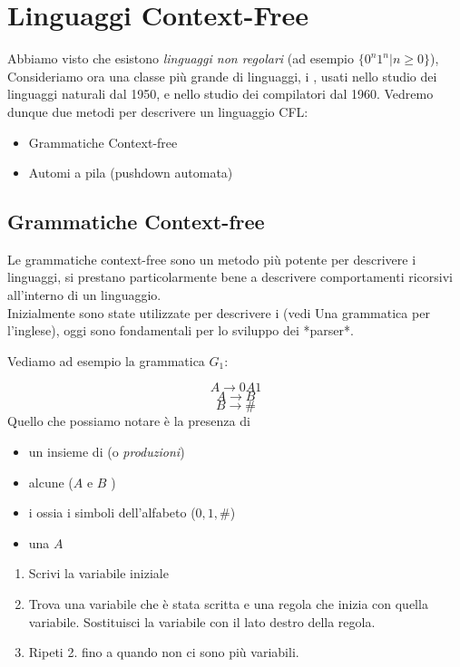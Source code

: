 \section{Linguaggi Context-Free}
Abbiamo visto che esistono \textit{linguaggi non regolari} (ad esempio $\{0^n1^n | n\geq 0\}$),
Consideriamo ora una classe più grande di linguaggi, i ,
usati nello studio dei linguaggi naturali dal 1950, e nello studio dei compilatori dal 1960.
Vedremo dunque due metodi per descrivere un linguaggio CFL:
\begin{itemize}
	\item Grammatiche Context-free
	\item Automi a pila (pushdown automata)
\end{itemize}

\subsection{Grammatiche Context-free}
Le grammatiche context-free sono un metodo più potente per descrivere i linguaggi, 
si prestano particolarmente bene a descrivere comportamenti ricorsivi all'interno di un linguaggio. \\
Inizialmente sono state utilizzate per descrivere i  
(vedi Una grammatica per l’inglese), 
oggi sono fondamentali per lo sviluppo dei *parser*.

Vediamo ad esempio la grammatica $G_1$:

$$A\rightarrow 0A1$$
$$A\rightarrow B$$
$$B\rightarrow \#$$
Quello che possiamo notare è la presenza di 
\begin{itemize}
	\item un insieme di  (o \textit{produzioni})
	\item alcune  ($A$ e $B$ )
	\item i  ossia i simboli dell'alfabeto ($0,1,\#$)
	\item una  $A$ 
\end{itemize}
\begin{enumerate}
	\item Scrivi la variabile iniziale
	\item Trova una variabile che è stata scritta e una regola che inizia con quella variabile.
		Sostituisci la variabile con il lato destro della regola. 
	\item Ripeti 2. fino a quando non ci sono più variabili.
\end{enumerate}

